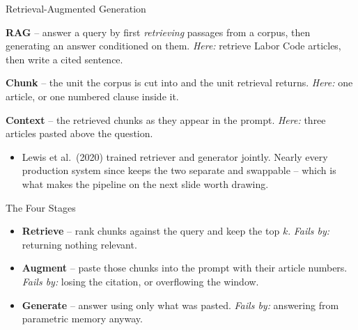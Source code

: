 \begin{frame}{Retrieval-Augmented Generation}
\begin{rldefinition}
\textbf{RAG} -- answer a query by first \emph{retrieving} passages from a corpus, then generating an answer conditioned on them. \emph{Here:} retrieve Labor Code articles, then write a cited sentence.

\smallskip
\textbf{Chunk} -- the unit the corpus is cut into and the unit retrieval returns. \emph{Here:} one article, or one numbered clause inside it.

\smallskip
\textbf{Context} -- the retrieved chunks as they appear in the prompt. \emph{Here:} three articles pasted above the question.
\end{rldefinition}
\pause
\begin{itemize}
  \item Lewis et al.\ (2020) trained retriever and generator jointly. Nearly every production system since keeps the two separate and swappable -- which is what makes the pipeline on the next slide worth drawing.
\end{itemize}
\end{frame}

\begin{frame}{The Four Stages}
\centering
{}

\vspace{0.5em}
\small
\begin{itemize}
  \item \textbf{Retrieve} -- rank chunks against the query and keep the top $k$. \emph{Fails by:} returning nothing relevant.
  \pause
  \item \textbf{Augment} -- paste those chunks into the prompt with their article numbers. \emph{Fails by:} losing the citation, or overflowing the window.
  \pause
  \item \textbf{Generate} -- answer using only what was pasted. \emph{Fails by:} answering from parametric memory anyway.
\end{itemize}
\end{frame}


